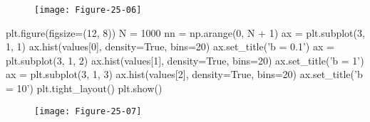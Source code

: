 \begin{figure}[H]
\centering
\texttt{[image: Figure-25-06]}
\end{figure}


\begin{python}
plt.figure(figsize=(12, 8))
N = 1000
nn = np.arange(0, N + 1)
ax = plt.subplot(3, 1, 1)
ax.hist(values[0], density=True, bins=20)
ax.set_title('b = 0.1')
ax = plt.subplot(3, 1, 2)
ax.hist(values[1], density=True, bins=20)
ax.set_title('b = 1')
ax = plt.subplot(3, 1, 3)
ax.hist(values[2], density=True, bins=20)
ax.set_title('b = 10')
plt.tight_layout()
plt.show()
\end{python}

\begin{figure}[H]
\centering
\texttt{[image: Figure-25-07]}
\end{figure}

